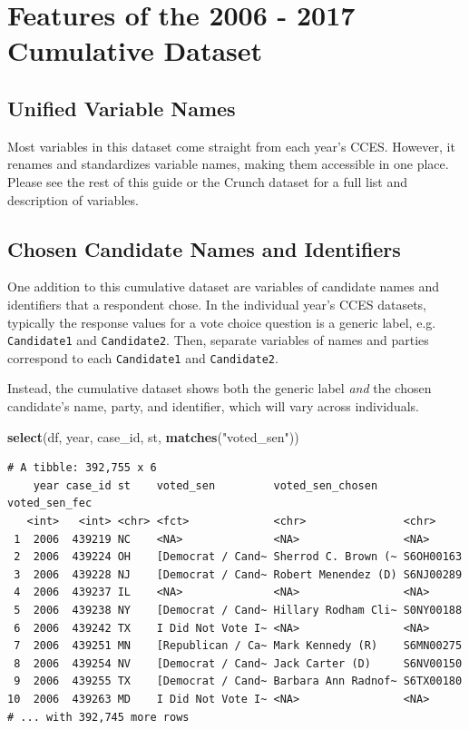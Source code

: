 \documentclass[10pt,article,oneside]{memoir}
\theoremstyle{definition}
\newenvironment{Shaded}{\begin{snugshade}}{\end{snugshade}}
\newcommand{\KeywordTok}[1]{\textcolor[rgb]{0.13,0.29,0.53}{\textbf{#1}}}
\newcommand{\StringTok}[1]{\textcolor[rgb]{0.31,0.60,0.02}{#1}}
\newcommand{\NormalTok}[1]{#1}
\begin{document}
\section{Features of the 2006 - 2017 Cumulative
Dataset}\label{features-of-the-2006---2017-cumulative-dataset}

\subsection{Unified Variable Names}\label{unified-variable-names}

Most variables in this dataset come straight from each year's CCES.
However, it renames and standardizes variable names, making them
accessible in one place. Please see the rest of this guide or the Crunch
dataset for a full list and description of variables.

\subsection{Chosen Candidate Names and
Identifiers}\label{chosen-candidate-names-and-identifiers}

One addition to this cumulative dataset are variables of candidate names
and identifiers that a respondent chose. In the individual year's CCES
datasets, typically the response values for a vote choice question is a
generic label, e.g. \texttt{Candidate1} and \texttt{Candidate2}. Then,
separate variables of names and parties correspond to each
\texttt{Candidate1} and \texttt{Candidate2}.

Instead, the cumulative dataset shows both the generic label \emph{and}
the chosen candidate's name, party, and identifier, which will vary
across individuals.

\begin{Shaded}
\begin{Highlighting}[]
\KeywordTok{select}\NormalTok{(df, year, case_id, st, }\KeywordTok{matches}\NormalTok{(}\StringTok{"voted_sen"}\NormalTok{))}
\end{Highlighting}
\end{Shaded}

\begin{verbatim}
# A tibble: 392,755 x 6
    year case_id st    voted_sen         voted_sen_chosen    voted_sen_fec
   <int>   <int> <chr> <fct>             <chr>               <chr>        
 1  2006  439219 NC    <NA>              <NA>                <NA>         
 2  2006  439224 OH    [Democrat / Cand~ Sherrod C. Brown (~ S6OH00163    
 3  2006  439228 NJ    [Democrat / Cand~ Robert Menendez (D) S6NJ00289    
 4  2006  439237 IL    <NA>              <NA>                <NA>         
 5  2006  439238 NY    [Democrat / Cand~ Hillary Rodham Cli~ S0NY00188    
 6  2006  439242 TX    I Did Not Vote I~ <NA>                <NA>         
 7  2006  439251 MN    [Republican / Ca~ Mark Kennedy (R)    S6MN00275    
 8  2006  439254 NV    [Democrat / Cand~ Jack Carter (D)     S6NV00150    
 9  2006  439255 TX    [Democrat / Cand~ Barbara Ann Radnof~ S6TX00180    
10  2006  439263 MD    I Did Not Vote I~ <NA>                <NA>         
# ... with 392,745 more rows
\end{verbatim}
\end{document}
